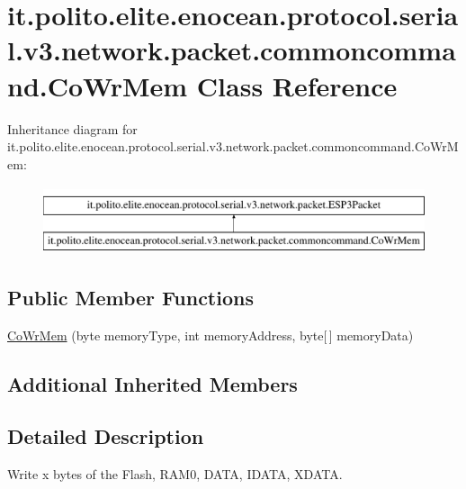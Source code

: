 \hypertarget{classit_1_1polito_1_1elite_1_1enocean_1_1protocol_1_1serial_1_1v3_1_1network_1_1packet_1_1commoncommand_1_1_co_wr_mem}{}\section{it.\+polito.\+elite.\+enocean.\+protocol.\+serial.\+v3.\+network.\+packet.\+commoncommand.\+Co\+Wr\+Mem Class Reference}
\label{classit_1_1polito_1_1elite_1_1enocean_1_1protocol_1_1serial_1_1v3_1_1network_1_1packet_1_1commoncommand_1_1_co_wr_mem}
Inheritance diagram for it.\+polito.\+elite.\+enocean.\+protocol.\+serial.\+v3.\+network.\+packet.\+commoncommand.\+Co\+Wr\+Mem\+:\begin{figure}[H]
\begin{center}
\leavevmode
\includegraphics[height=2.000000cm]{classit_1_1polito_1_1elite_1_1enocean_1_1protocol_1_1serial_1_1v3_1_1network_1_1packet_1_1commoncommand_1_1_co_wr_mem}
\end{center}
\end{figure}
\subsection*{Public Member Functions}
\begin{DoxyCompactItemize}
\item 
\hyperlink{classit_1_1polito_1_1elite_1_1enocean_1_1protocol_1_1serial_1_1v3_1_1network_1_1packet_1_1commoncommand_1_1_co_wr_mem_aedf24d2546fd5a27c72a8278203f5ff0}{Co\+Wr\+Mem} (byte memory\+Type, int memory\+Address, byte\mbox{[}$\,$\mbox{]} memory\+Data)
\end{DoxyCompactItemize}
\subsection*{Additional Inherited Members}


\subsection{Detailed Description}
Write x bytes of the Flash, R\+A\+M0, D\+A\+TA, I\+D\+A\+TA, X\+D\+A\+TA.

